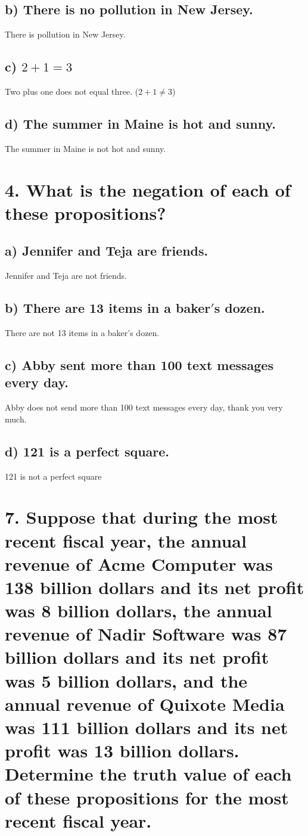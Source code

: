 \documentclass[11pt, oneside]{article} %
\numberwithin{equation}{section} %
\numberwithin{figure}{section} %
\numberwithin{table}{section} %
\begin{document}
\subsection{b) There is no pollution in New Jersey.}
There is pollution in New Jersey.
\subsection{c) $2 + 1 = 3$}
Two plus one does not equal three. ($2 + 1 \neq 3$)
\subsection{d) The summer in Maine is hot and sunny.}
The summer in Maine is not hot and sunny.


\section{4. What is the negation of each of these propositions?}
\subsection{a) Jennifer and Teja are friends.}
Jennifer and Teja are not friends.
\subsection{b) There are 13 items in a baker$'$s dozen.}
There are not 13 items in a baker's dozen.
\subsection{c) Abby sent more than 100 text messages every day.}
Abby does not send more than 100 text messages every day, thank you very much.
\subsection{d) 121 is a perfect square.}
121 is not a perfect square


\section{7. Suppose that during the most recent fiscal year, the annual revenue of Acme Computer was 138 billion dollars and its net profit was 8 billion dollars, the annual revenue of Nadir Software was 87 billion dollars and its net profit was 5 billion dollars, and the annual revenue of Quixote Media was 111 billion dollars and its net profit was 13 billion dollars.\\
Determine the truth value of each of these propositions for the most recent fiscal year.}
\end{document}
